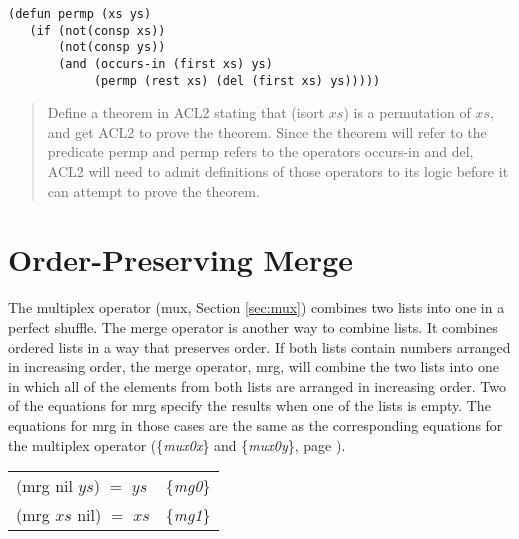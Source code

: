 \begin{exercises}
\label{defun:permp}
\begin{code}
\begin{verbatim}
(defun permp (xs ys)
   (if (not(consp xs))
       (not(consp ys))
       (and (occurs-in (first xs) ys)
            (permp (rest xs) (del (first xs) ys)))))
\end{verbatim}
\end{code}
\begin{quote}
Define a theorem in ACL2 stating that \textsf{(isort $xs$)} is a
permutation of $xs$, and
get ACL2 to prove the theorem.
Since the theorem will refer to the predicate \textsf{permp}
and \textsf{permp} refers to the operators \textsf{occurs-in} and \textsf{del},
ACL2 will need to admit definitions of those operators
to its logic before it can attempt to prove the theorem.
\end{quote}

\end{exercises}

\section{Order-Preserving Merge}
\label{sec:mrg}

The multiplex operator (\textsf{mux}, Section \ref{sec:mux})
combines two lists into one in a perfect shuffle.
The merge operator is another way to combine lists.
It combines ordered lists
in a way that preserves order.
If both lists contain numbers arranged in increasing order,
the merge operator, \textsf{mrg},
will combine the two lists
into one in which all of the elements from both lists
are arranged in increasing order.
Two of the equations for \textsf{mrg}
specify the results when one of the lists is empty.
The equations for \textsf{mrg} in those cases are the same as
the corresponding equations for the multiplex operator
(\{\emph{mux0x}\} and \{\emph{mux0y}\}, page \pageref{def:mux}).

\begin{center}
\begin{tabular}{ll}
\textsf{(mrg nil $ys$) $=$ $ys$} & \{\emph{mg0}\} \\
\textsf{(mrg $xs$ nil) $=$ $xs$} & \{\emph{mg1}\} \\
\end{tabular}
\end{center}


